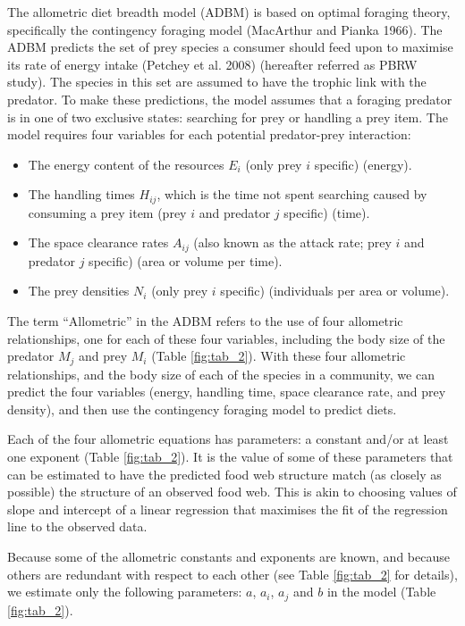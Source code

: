 \documentclass{article}
\begin{document}
The allometric diet breadth model (ADBM) is based on optimal foraging
theory, specifically the contingency foraging model (MacArthur and
Pianka 1966). The ADBM predicts the set of prey species a consumer
should feed upon to maximise its rate of energy intake (Petchey et al.
2008) (hereafter referred as PBRW study). The species in this set are
assumed to have the trophic link with the predator. To make these
predictions, the model assumes that a foraging predator is in one of two
exclusive states: searching for prey or handling a prey item. The model
requires four variables for each potential predator-prey interaction:

\begin{itemize}
\tightlist
\item
  The energy content of the resources \(E_i\) (only prey \(i\) specific)
  (energy).
\item
  The handling times \(H_{ij}\), which is the time not spent searching
  caused by consuming a prey item (prey \(i\) and predator \(j\)
  specific) (time).
\item
  The space clearance rates \(A_{ij}\) (also known as the attack rate;
  prey \(i\) and predator \(j\) specific) (area or volume per time).
\item
  The prey densities \(N_i\) (only prey \(i\) specific) (individuals per
  area or volume).
\end{itemize}

The term ``Allometric'' in the ADBM refers to the use of four allometric
relationships, one for each of these four variables, including the body
size of the predator \(M_j\) and prey \(M_i\) (Table \ref{fig:tab_2}).
With these four allometric relationships, and the body size of each of
the species in a community, we can predict the four variables (energy,
handling time, space clearance rate, and prey density), and then use the
contingency foraging model to predict diets.

Each of the four allometric equations has parameters: a constant and/or
at least one exponent (Table \ref{fig:tab_2}). It is the value of some
of these parameters that can be estimated to have the predicted food web
structure match (as closely as possible) the structure of an observed
food web. This is akin to choosing values of slope and intercept of a
linear regression that maximises the fit of the regression line to the
observed data.

Because some of the allometric constants and exponents are known, and
because others are redundant with respect to each other (see Table
\ref{fig:tab_2} for details), we estimate only the following parameters:
\(a\), \(a_i\), \(a_j\) and \(b\) in the model (Table \ref{fig:tab_2}).
\end{document}
